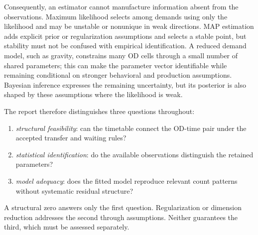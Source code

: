 Consequently, an estimator cannot manufacture information absent from the
observations.  Maximum likelihood selects among demands using only the
likelihood and may be unstable or nonunique in weak directions.  MAP estimation
adds explicit prior or regularization assumptions and selects a stable point,
but stability must not be confused with empirical identification.  A reduced
demand model, such as gravity, constrains many OD cells through a small number
of shared parameters; this can make the parameter vector identifiable while
remaining conditional on stronger behavioral and production assumptions.
Bayesian inference expresses the remaining uncertainty, but its posterior is
also shaped by these assumptions where the likelihood is weak.

The report therefore distinguishes three questions throughout:
\begin{enumerate}
  \item \emph{structural feasibility}: can the timetable connect the OD-time
        pair under the accepted transfer and waiting rules?
  \item \emph{statistical identification}: do the available observations
        distinguish the retained parameters?
  \item \emph{model adequacy}: does the fitted model reproduce relevant count
        patterns without systematic residual structure?
\end{enumerate}
A structural zero answers only the first question.  Regularization or dimension
reduction addresses the second through assumptions.  Neither guarantees the
third, which must be assessed separately.
